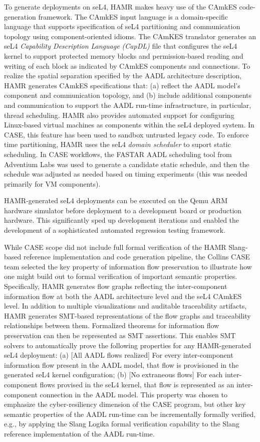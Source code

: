 To generate deployments on seL4, HAMR makes heavy use of the
CAmkES code-generation framework.   The CAmkES input
language is a domain-specific language that supports specification
of seL4 partitioning and communication topology using
component-oriented idioms.  The CAmKES translator generates an
seL4 \emph{Capability Description Language (CapDL)} file that
configures the seL4 kernel to support protected memory blocks
and permission-based reading and writing of each block as
indicated by CAmkES components and connections.
To realize the spatial separation specified by the AADL
architecture description, HAMR generates CAmkES specifications
that: (a) reflect the AADL model's component and communication
topology, and (b) include additional components and communication
to support the AADL run-time infrastructure, in particular,
thread scheduling.
HAMR also provides automated support for configuring Linux-based
virtual machines as components within the seL4 deployed system. 
In CASE, this feature has been used to sandbox untrusted legacy code.
To enforce time partitioning, HAMR uses the seL4 \emph{domain
scheduler} to suport static scheduling.  In CASE workflows,
the FASTAR AADL scheduling tool from Adventium Labs was used
to generate a candidate static schedule, and then the schedule
was adjusted as needed based on timing experiments (this was
needed primarily for VM components).

HAMR-generated seL4 deployments can be executed on the Qemu ARM
hardware simulator before deployment to a development board or
production hardware.  This significantly sped up development
iterations and enabled the development of a sophisticated
automated regression testing framework.

While CASE scope did not include full formal verification of
the HAMR Slang-based reference implementation and code generation
pipeline, the Collins CASE team selected the key property of
information flow preservation to illustrate how one might build
out to formal verification of important semantic properties.
Specifically, HAMR generates flow graphs reflecting the
inter-component information flow at both the AADL architecture
level and the seL4 CAmkES level.  In addition to multiple
visualizations and auditable traceability artifacts, HAMR
generates SMT-based representations of the flow graphs and
traceability relationships between them.  Formalized
theorems for information flow preservation can then be represented as
SMT assertions.  This enables SMT solvers to automatically prove
the following properties for any HAMR-generated seL4 deployment:
(a) [All AADL flows realized] For every inter-component information
flow present in the AADL model, that flow is provisioned in the
generated seL4 kernel configuration;  (b) [No extraneous flows] For
each inter-component flows provised in the seL4 kernel, that
flow is represented as an inter-component connection in the
AADL model.   This property was chosen to emphasize the
cyber-resiliency dimension of the CASE program, but other
key semantic properties of the AADL run-time can be incrementally
formally verified, e.g., by applying the Slang Logika formal
verification capability to the Slang reference implementation of the
AADL run-time.  

